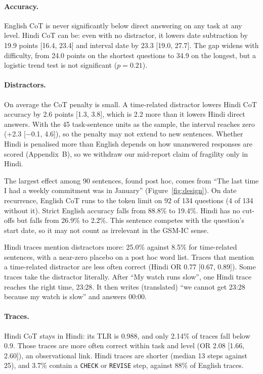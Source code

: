 \documentclass[11pt]{article}
\begin{document}
\paragraph{Accuracy.}
English CoT is never significantly below direct answering on any task at any level. Hindi CoT can be: even with no distractor, it lowers date subtraction by 19.9 points [16.4, 23.4] and interval date by 23.3 [19.0, 27.7]. The gap widens with difficulty, from 24.0 points on the shortest questions to 34.9 on the longest, but a logistic trend test is not significant ($p=0.21$).

\paragraph{Distractors.}
On average the CoT penalty is small. A time-related distractor lowers Hindi CoT accuracy by 2.6 points [1.3, 3.8], which is 2.2 more than it lowers Hindi direct answers. With the 45 task-sentence units as the sample, the interval reaches zero (+2.3 [$-$0.1, 4.6]), so the penalty may not extend to new sentences. Whether Hindi is penalised more than English depends on how unanswered responses are scored (Appendix~B), so we withdraw our mid-report claim of fragility only in Hindi.

The largest effect among 90 sentences, found post hoc, comes from ``The last time I had a weekly commitment was in January'' (Figure~\ref{fig:design}). On date recurrence, English CoT runs to the token limit on 92 of 134 questions (4 of 134 without it). Strict English accuracy falls from 88.8\% to 19.4\%. Hindi has no cut-offs but falls from 26.9\% to 2.2\%. This sentence competes with the question's start date, so it may not count as irrelevant in the GSM-IC sense.

Hindi traces mention distractors more: 25.0\% against 8.5\% for time-related sentences, with a near-zero placebo on a post hoc word list. Traces that mention a time-related distractor are less often correct (Hindi OR 0.77 [0.67, 0.89]). Some traces take the distractor literally. After ``My watch runs slow'', one Hindi trace reaches the right time, 23:28. It then writes (translated) ``we cannot get 23:28 because my watch is slow'' and answers 00:00.

\paragraph{Traces.}
Hindi CoT stays in Hindi: its TLR is 0.988, and only 2.14\% of traces fall below 0.9. Those traces are more often correct within task and level (OR 2.08 [1.66, 2.60]), an observational link. Hindi traces are shorter (median 13 steps against 25), and 3.7\% contain a \texttt{CHECK} or \texttt{REVISE} step, against 88\% of English traces.
\end{document}
